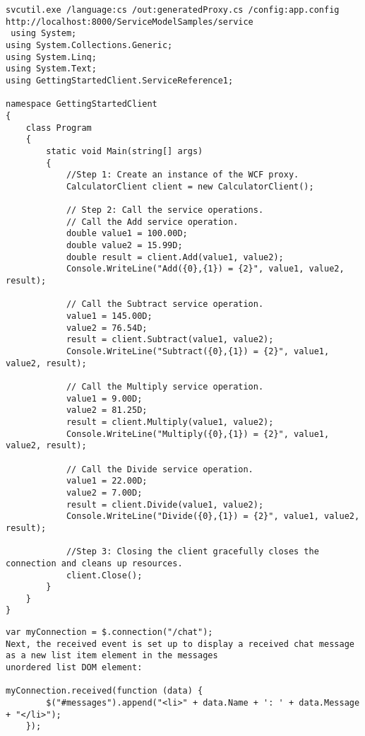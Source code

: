 \documentclass[a4paper,10pt]{scrreprt}
\begin{document}
\begin{lstlisting}[caption=wcf client side]
svcutil.exe /language:cs /out:generatedProxy.cs /config:app.config http://localhost:8000/ServiceModelSamples/service
 using System;
using System.Collections.Generic;
using System.Linq;
using System.Text;
using GettingStartedClient.ServiceReference1;

namespace GettingStartedClient
{
    class Program
    {
        static void Main(string[] args)
        {
            //Step 1: Create an instance of the WCF proxy.
            CalculatorClient client = new CalculatorClient();

            // Step 2: Call the service operations.
            // Call the Add service operation.
            double value1 = 100.00D;
            double value2 = 15.99D;
            double result = client.Add(value1, value2);
            Console.WriteLine("Add({0},{1}) = {2}", value1, value2, result);

            // Call the Subtract service operation.
            value1 = 145.00D;
            value2 = 76.54D;
            result = client.Subtract(value1, value2);
            Console.WriteLine("Subtract({0},{1}) = {2}", value1, value2, result);

            // Call the Multiply service operation.
            value1 = 9.00D;
            value2 = 81.25D;
            result = client.Multiply(value1, value2);
            Console.WriteLine("Multiply({0},{1}) = {2}", value1, value2, result);

            // Call the Divide service operation.
            value1 = 22.00D;
            value2 = 7.00D;
            result = client.Divide(value1, value2);
            Console.WriteLine("Divide({0},{1}) = {2}", value1, value2, result);

            //Step 3: Closing the client gracefully closes the connection and cleans up resources.
            client.Close();
        }
    }
}
\end{lstlisting}
\begin{lstlisting}[caption=signalr js]
var myConnection = $.connection("/chat");
Next, the received event is set up to display a received chat message as a new list item element in the messages 
unordered list DOM element:

myConnection.received(function (data) {
        $("#messages").append("<li>" + data.Name + ': ' + data.Message + "</li>");
    });
 
\end{lstlisting}
\end{document}

